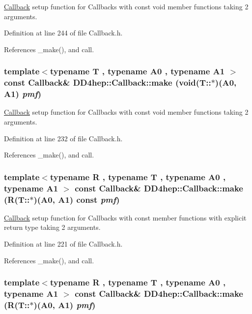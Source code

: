 \hyperlink{class_d_d4hep_1_1_callback}{Callback} setup function for Callbacks with const void member functions taking 2 arguments. 

Definition at line 244 of file Callback.h.

References \_\-make(), and call.\hypertarget{class_d_d4hep_1_1_callback_aa18a59952eb491c6fcfd8f8fc2c9bf04}{
\subsubsection[{make}]{\setlength{\rightskip}{0pt plus 5cm}template$<$typename T , typename A0 , typename A1 $>$ const {\bf Callback}\& DD4hep::Callback::make (void(T::$\ast$)(A0, A1) {\em pmf})}}
\label{class_d_d4hep_1_1_callback_aa18a59952eb491c6fcfd8f8fc2c9bf04}


\hyperlink{class_d_d4hep_1_1_callback}{Callback} setup function for Callbacks with const void member functions taking 2 arguments. 

Definition at line 232 of file Callback.h.

References \_\-make(), and call.\hypertarget{class_d_d4hep_1_1_callback_abc72652496b83fa106b141b86fffca6c}{
\subsubsection[{make}]{\setlength{\rightskip}{0pt plus 5cm}template$<$typename R , typename T , typename A0 , typename A1 $>$ const {\bf Callback}\& DD4hep::Callback::make (R(T::$\ast$)(A0, A1) const  {\em pmf})}}
\label{class_d_d4hep_1_1_callback_abc72652496b83fa106b141b86fffca6c}


\hyperlink{class_d_d4hep_1_1_callback}{Callback} setup function for Callbacks with const member functions with explicit return type taking 2 arguments. 

Definition at line 221 of file Callback.h.

References \_\-make(), and call.\hypertarget{class_d_d4hep_1_1_callback_ab9493ba45378fdb3ed3d9a906b7e3d73}{
\subsubsection[{make}]{\setlength{\rightskip}{0pt plus 5cm}template$<$typename R , typename T , typename A0 , typename A1 $>$ const {\bf Callback}\& DD4hep::Callback::make (R(T::$\ast$)(A0, A1) {\em pmf})}}
\label{class_d_d4hep_1_1_callback_ab9493ba45378fdb3ed3d9a906b7e3d73}


